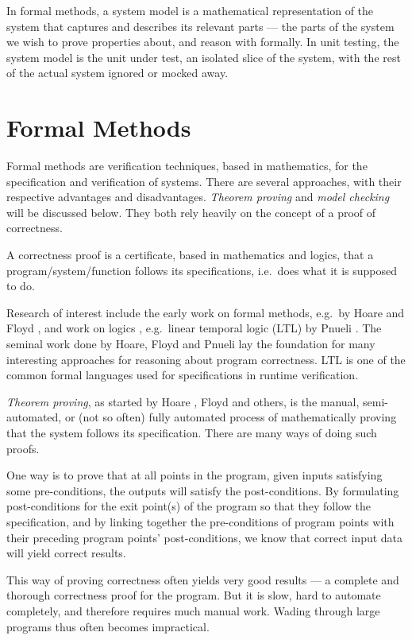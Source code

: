\documentclass[a4paper,11pt]{kth-mag}
\begin{document}
In formal methods, a system model is a mathematical representation of the
system that captures and describes its relevant parts --- the parts of the
system we wish to prove properties about, and reason with formally. In unit
testing, the system model is the unit under test, an isolated slice of the
system, with the rest of the actual system ignored or mocked away.


\section{Formal Methods} \label{section-formal-methods}

Formal methods are verification techniques, based in mathematics, for the
specification and verification of systems. There are several approaches, with
their respective advantages and disadvantages. \textit{Theorem proving} and
\textit{model checking} will be discussed below. They both rely heavily on the
concept of a proof of correctness.

A correctness proof is a certificate, based in mathematics and logics, that a
program/system/function follows its specifications, i.e.\ does what it is
supposed to do.

Research of interest include the early work on formal methods, e.g.\ by Hoare
\cite{hoare69} and Floyd \cite{floyd67}, and work on logics , e.g.\ linear
temporal logic (LTL) by Pnueli \cite{pnueli77}. The seminal work done by Hoare,
Floyd and Pnueli lay the foundation for many interesting approaches for
reasoning about program correctness. LTL is one of the common formal languages
used for specifications in runtime verification.

\textit{Theorem proving}, as started by Hoare \cite{hoare69}, Floyd
\cite{floyd67} and others, is the manual, semi-automated, or (not so often)
fully automated process of mathematically proving that the system follows its
specification. There are many ways of doing such proofs.

One way is to prove that at all points in the program, given inputs satisfying
some pre-conditions, the outputs will satisfy the post-conditions. By
formulating post-conditions for the exit point(s) of the program so that they
follow the specification, and by linking together the pre-conditions of program
points with their preceding program points' post-conditions, we know that
correct input data will yield correct results.

This way of proving correctness often yields very good results --- a complete
and thorough correctness proof for the program. But it is slow, hard to
automate completely, and therefore requires much manual work.  Wading through
large programs thus often becomes impractical.
\end{document}
